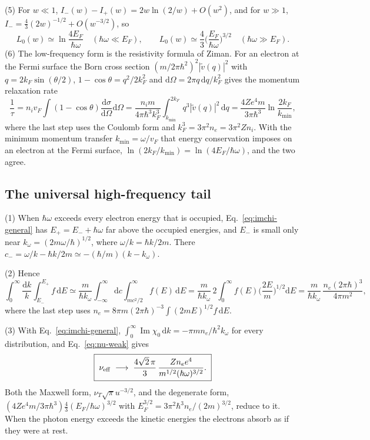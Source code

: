 \documentclass[11pt]{article}
\numberwithin{equation}{section}
\newcommand{\nuT}{\nu_T}
\newcommand{\nueff}{\nu_{\rm eff}}
\newcommand{\dd}{\mathrm d}
\DeclareMathOperator{\Imag}{Im}
\begin{document}
{\noindent}(5) For $w\ll1$, $I_-(w)-I_+(w)=2w\ln(2/w)+O(w^2)$, and for
$w\gg1$, $I_-=\tfrac43(2w)^{-1/2}+O(w^{-3/2})$, so
\begin{equation}
\boxed{\;L_0(w)\simeq\ln\frac{4E_F}{\hbar\omega}\quad(\hbar\omega\ll E_F),\qquad
L_0(w)\simeq\frac43\Big(\frac{E_F}{\hbar\omega}\Big)^{3/2}\quad(\hbar\omega\gg E_F).\;}
\label{eq:L0-limits}
\end{equation}
{\noindent}(6) The low-frequency form is the resistivity formula of Ziman.
For an electron at the Fermi surface the Born cross section
$(m/2\pi\hbar^2)^2|\tilde v(q)|^2$ with $q=2k_F\sin(\theta/2)$,
$1-\cos\theta=q^2/2k_F^2$ and $\dd\Omega=2\pi q\,\dd q/k_F^2$ gives the momentum
relaxation rate
\begin{equation}
\frac1\tau=n_iv_F\int(1-\cos\theta)\frac{\dd\sigma}{\dd\Omega}\dd\Omega
=\frac{n_im}{4\pi\hbar^3k_F^3}\int_{k_{\min}}^{2k_F}q^3|\tilde v(q)|^2\,\dd q
=\frac{4Ze^4m}{3\pi\hbar^3}\ln\frac{2k_F}{k_{\min}},
\end{equation}
where the last step uses the Coulomb form and $k_F^3=3\pi^2n_e=3\pi^2Zn_i$.
With the minimum momentum transfer $k_{\min}=\omega/v_F$ that energy
conservation imposes on an electron at the Fermi surface,
$\ln(2k_F/k_{\min})=\ln(4E_F/\hbar\omega)$, and the two agree.

\subsection{The universal high-frequency tail}
{\noindent}(1) When $\hbar\omega$ exceeds every electron energy that is
occupied, Eq.~\eqref{eq:imchi-general} has $E_+=E_-+\hbar\omega$ far above the
occupied energies, and $E_-$ is small only near $k_\omega=(2m\omega/\hbar)^{1/2}$,
where $\omega/k=\hbar k/2m$. There $c_-=\omega/k-\hbar k/2m\simeq-(\hbar/m)(k-k_\omega)$.

{\noindent}(2) Hence
\begin{equation}
\int_0^\infty\frac{\dd k}{k}\int_{E_-}^{E_+}f\,\dd E\simeq\frac{m}{\hbar k_\omega}
\int_{-\infty}^\infty\dd c\int_{mc^2/2}^\infty f(E)\,\dd E
=\frac{m}{\hbar k_\omega}\,2\int_0^\infty f(E)\Big(\frac{2E}{m}\Big)^{1/2}\dd E
=\frac{m}{\hbar k_\omega}\,\frac{n_e(2\pi\hbar)^3}{4\pi m^2},
\end{equation}
where the last step uses $n_e=8\pi m(2\pi\hbar)^{-3}\int(2mE)^{1/2}f\,\dd E$.

{\noindent}(3) With Eq.~\eqref{eq:imchi-general}, $\int_0^\infty\Imag\chi_0\,\dd k=-\pi mn_e/\hbar^2k_\omega$
for every distribution, and Eq.~\eqref{eq:nu-weak} gives
\begin{equation}
\boxed{\;\nueff\;\longrightarrow\;\frac{4\sqrt2\,\pi}{3}\,\frac{Zn_ee^4}{m^{1/2}(\hbar\omega)^{3/2}}.\;}
\label{eq:tail}
\end{equation}
Both the Maxwell form, $\nuT\sqrt\pi u^{-3/2}$, and the degenerate form,
$(4Ze^4m/3\pi\hbar^3)\tfrac43(E_F/\hbar\omega)^{3/2}$ with
$E_F^{3/2}=3\pi^2\hbar^3n_e/(2m)^{3/2}$, reduce to it. When the photon energy
exceeds the kinetic energies the electrons absorb as if they were at rest.
\end{document}
